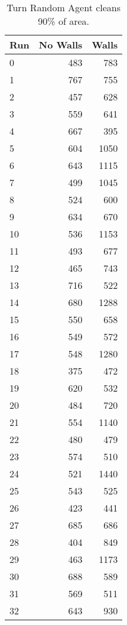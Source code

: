 \begin{table}
\vspace{-5em}
\caption{Turn Random Agent cleans 90\% of area.}
\vspace{-1.5em}
\label{tab:Random}
\begin{center}
	\footnotesize
\begin{tabular}{lrr}
\toprule
Run &  No Walls &  Walls \\
\midrule
0  &       483 &    783 \\
1  &       767 &    755 \\
2  &       457 &    628 \\
3  &       559 &    641 \\
4  &       667 &    395 \\
5  &       604 &   1050 \\
6  &       643 &   1115 \\
7  &       499 &   1045 \\
8  &       524 &    600 \\
9  &       634 &    670 \\
10 &       536 &   1153 \\
11 &       493 &    677 \\
12 &       465 &    743 \\
13 &       716 &    522 \\
14 &       680 &   1288 \\
15 &       550 &    658 \\
16 &       549 &    572 \\
17 &       548 &   1280 \\
18 &       375 &    472 \\
19 &       620 &    532 \\
20 &       484 &    720 \\
21 &       554 &   1140 \\
22 &       480 &    479 \\
23 &       574 &    510 \\
24 &       521 &   1440 \\
25 &       543 &    525 \\
26 &       423 &    441 \\
27 &       685 &    686 \\
28 &       404 &    849 \\
29 &       463 &   1173 \\
30 &       688 &    589 \\
31 &       569 &    511 \\
32 &       643 &    930 \\

\end{tabular}
\end{center}
\end{table}

